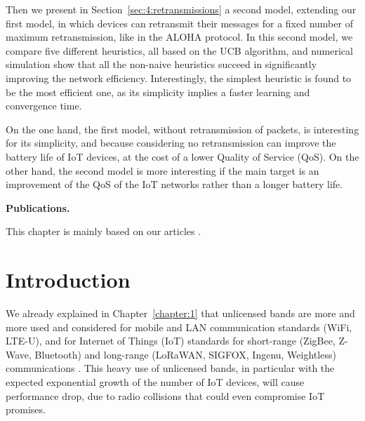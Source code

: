 Then we present in Section~\ref{sec:4:retransmissions} a second model, extending our first model, in which devices can retransmit their messages for a fixed number of maximum retransmission, like in the ALOHA protocol.
In this second model, we compare five different heuristics, all based on the UCB algorithm, and numerical simulation show that all the non-naive heuristics succeed in significantly improving the network efficiency.
Interestingly, the simplest heuristic is found to be the most efficient one, as its simplicity implies a faster learning and convergence time.

On the one hand, the first model, without retransmission of packets, is interesting for its simplicity, and because considering no retransmission can improve the battery life of IoT devices, at the cost of a lower Quality of Service (QoS).
On the other hand, the second model is more interesting if the main target is an improvement of the QoS of the IoT networks rather than a longer battery life.


\vfill{}

\textbf{Publications.}

This chapter is mainly based on our articles \cite{Bonnefoi17,Besson2018ICT,Besson2019WCNC,Bonnefoi2019WCNC}.

\newpage


\section{Introduction}
\label{sec:4:motivations}

We already explained in Chapter~\ref{chapter:1} that
unlicensed bands are more and more used and considered for mobile and LAN communication standards (WiFi, LTE-U), and for Internet of Things (IoT) standards for short-range (ZigBee, Z-Wave, Bluetooth) and long-range (LoRaWAN, SIGFOX, Ingenu, Weightless) communications \cite{Centenaro16}.
This heavy use of unlicensed bands, in particular with the expected exponential growth of the number of IoT devices, will cause performance drop, due to radio collisions that could even compromise IoT promises.

